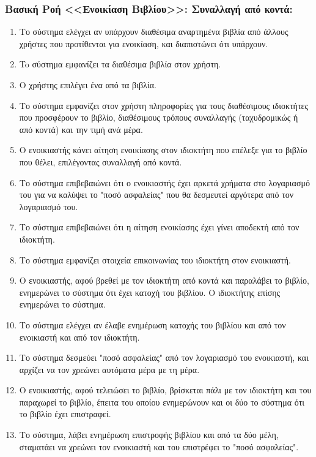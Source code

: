 \documentclass[12pt,a4paper]{article}
\begin{document}
\subsubsection*{Βασική Ροή <<Ενοικίαση Βιβλίου>>: Συναλλαγή από κοντά:}
\begin{enumerate}
    \item Το σύστημα ελέγχει αν υπάρχουν διαθέσιμα αναρτημένα βιβλία από άλλους χρήστες που προτίθενται για ενοικίαση, και διαπιστώνει ότι υπάρχουν.
    \label{Έλεγχος ύπαρξης βιβλίου}
    \item To σύστημα εμφανίζει τα διαθέσιμα βιβλία στον χρήστη.
    \item Ο χρήστης επιλέγει ένα από τα βιβλία.
    \item Το σύστημα εμφανίζει στον χρήστη πληροφορίες για τους διαθέσιμους ιδιοκτήτες που προσφέρουν το βιβλίο, διαθέσιμους τρόπους συναλλαγής (ταχυδρομικώς ή από κοντά) και την τιμή ανά μέρα.
    \item Ο ενοικιαστής κάνει αίτηση ενοικίασης στον ιδιοκτήτη που επέλεξε για το βιβλίο που θέλει, επιλέγοντας συναλλαγή από κοντά.
    \label{Επιλογή τρόπου συναλλαγής}
    \item Το σύστημα επιβεβαιώνει ότι ο ενοικιαστής έχει αρκετά χρήματα στο λογαριασμό του για να καλύψει το "ποσό ασφαλείας" που θα δεσμευτεί αργότερα από τον λογαριασμό του.
    \label{Έλεγχος ποσού ασφαλείας}
    \item Το σύστημα επιβεβαιώνει ότι η αίτηση ενοικίασης έχει γίνει αποδεκτή από τον ιδιοκτήτη.
    \label{Αποδοχή ή απόρριψη συναλλαγής}
    \item Το σύστημα εμφανίζει στοιχεία επικοινωνίας του ιδιοκτήτη στον ενοικιαστή.
    \item Ο ενοικιαστής, αφού βρεθεί με τον ιδιοκτήτη από κοντά και παραλάβει το βιβλίο, ενημερώνει το σύστημα ότι έχει κατοχή του βιβλίου. Ο ιδιοκτήτης επίσης ενημερώνει το σύστημα.
    \item Το σύστημα ελέγχει αν έλαβε ενημέρωση κατοχής του βιβλίου και από τον ενοικιαστή και από τον ιδιοκτήτη.
    \label {Δεν ενημερώνεται η κατοχή}
    \item Το σύστημα δεσμεύει "ποσό ασφαλείας" από τον λογαριασμό του ενοικιαστή, και αρχίζει να τον χρεώνει αυτόματα μέρα με τη μέρα.
    \label{Τέλος dispute resolved - Τέλος χρημάτων}
    \item Ο ενοικιαστής, αφού τελειώσει το βιβλίο, βρίσκεται πάλι με τον ιδιοκτήτη και του παραχωρεί το βιβλίο, έπειτα του οποίου ενημερώνουν και οι δύο το σύστημα ότι το βιβλίο έχει επιστραφεί.
    \label{Επιστροφή βιβλίου - Τέλος λεφτά δεν φτάνουν}
    \item Το σύστημα, λάβει ενημέρωση επιστροφής βιβλίου και από τα δύο μέλη, σταματάει να χρεώνει τον ενοικιαστή και του επιστρέφει το "ποσό ασφαλείας".
    \label{Τέλος ενοικίασης}
\end{enumerate}
\end{document}

